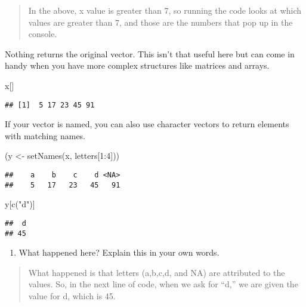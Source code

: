 \documentclass[
]{article}
\newenvironment{Shaded}{\begin{snugshade}}{\end{snugshade}}
\newcommand{\DecValTok}[1]{\textcolor[rgb]{0.00,0.00,0.81}{#1}}
\newcommand{\FunctionTok}[1]{\textcolor[rgb]{0.00,0.00,0.00}{#1}}
\newcommand{\NormalTok}[1]{#1}
\newcommand{\OtherTok}[1]{\textcolor[rgb]{0.56,0.35,0.01}{#1}}
\newcommand{\SpecialCharTok}[1]{\textcolor[rgb]{0.00,0.00,0.00}{#1}}
\newcommand{\StringTok}[1]{\textcolor[rgb]{0.31,0.60,0.02}{#1}}
\providecommand{\tightlist}{%
  \setlength{\itemsep}{0pt}\setlength{\parskip}{0pt}}
\begin{document}
\begin{quote}
In the above, x value is greater than 7, so running the code looks at
which values are greater than 7, and those are the numbers that pop up
in the console.
\end{quote}

Nothing returns the original vector. This isn't that useful here but can
come in handy when you have more complex structures like matrices and
arrays.

\begin{Shaded}
\begin{Highlighting}[]
\NormalTok{x[]}
\end{Highlighting}
\end{Shaded}

\begin{verbatim}
## [1]  5 17 23 45 91
\end{verbatim}

If your vector is named, you can also use character vectors to return
elements with matching names.

\begin{Shaded}
\begin{Highlighting}[]
\NormalTok{(y }\OtherTok{\textless{}{-}} \FunctionTok{setNames}\NormalTok{(x, letters[}\DecValTok{1}\SpecialCharTok{:}\DecValTok{4}\NormalTok{]))}
\end{Highlighting}
\end{Shaded}

\begin{verbatim}
##    a    b    c    d <NA> 
##    5   17   23   45   91
\end{verbatim}

\begin{Shaded}
\begin{Highlighting}[]
\NormalTok{y[}\FunctionTok{c}\NormalTok{(}\StringTok{"d"}\NormalTok{)]}
\end{Highlighting}
\end{Shaded}

\begin{verbatim}
##  d 
## 45
\end{verbatim}

\begin{enumerate}
\def\labelenumi{(\arabic{enumi})}
\setcounter{enumi}{3}
\tightlist
\item
  What happened here? Explain this in your own words.
\end{enumerate}

\begin{quote}
What happened is that letters (a,b,c,d, and NA) are attributed to the
values. So, in the next line of code, when we ask for ``d,'' we are
given the value for d, which is 45.
\end{quote}
\end{document}
